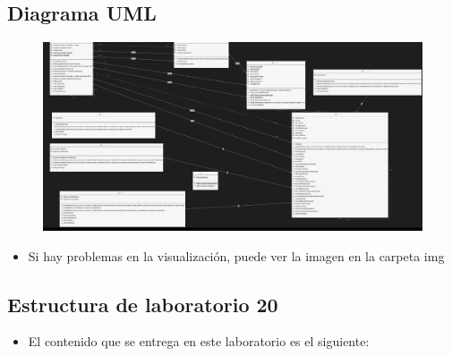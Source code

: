\documentclass{article}
\begin{document}
	
	
	\subsection{Diagrama UML}
	
	\begin{figure}[H]
		\centering
		\includegraphics[width=1\textwidth,keepaspectratio]{img/uml.png}
	\end{figure}
	
	\begin{itemize}	
			\item Si hay problemas en la visualización, puede ver la imagen en la carpeta img
	\end{itemize}
	
	\subsection{Estructura de laboratorio 20}
	\begin{itemize}	
		\item El contenido que se entrega en este laboratorio es el siguiente:
	\end{itemize}
	
\end{document}
